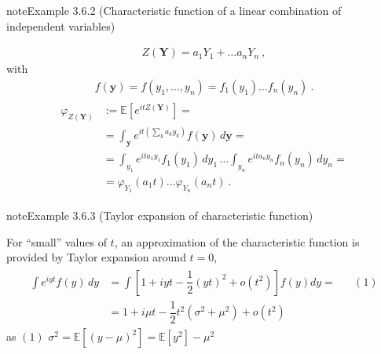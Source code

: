\documentclass[letterpaper,10pt,english]{jupyterBook}
\begin{document}
\begin{sphinxadmonition}{note}{Example 3.6.2 (Characteristic function of a linear combination of independent variables)}


\begin{equation*}
\begin{split}Z(\mathbf{Y}) = a_1 Y_1 + \dots a_n Y_n \ ,\end{split}
\end{equation*}
\sphinxAtStartPar
with
\begin{equation*}
\begin{split}f(\mathbf{y}) = f(y_1, \dots, y_n) =  f_1(y_1) \dots f_n(y_n) \ .\end{split}
\end{equation*}\begin{equation*}
\begin{split}\begin{aligned}
  \varphi_{Z(\mathbf{Y})} 
  & := \mathbb{E}\left[ e^{i t Z(\mathbf{Y})} \right] = \\
  & = \int_{\mathbf{y}} e^{i t \left( \sum_k a_k y_k \right)} f(\mathbf{y}) \, d \mathbf{y} = \\
  & = \int_{y_1} e^{i t a_1 y_1} f_1(y_1) \, d y_1 \, \dots \int_{y_n} e^{i t a_n y_n} f_n(y_n) \, d y_n = \\
  & = \varphi_{Y_1}(a_1 t) \dots \varphi_{Y_n}(a_n t) \ . 
\end{aligned}\end{split}
\end{equation*}\end{sphinxadmonition}
\label{ch/prob/characteristic-fun:ex:char-fun:taylor}
\begin{sphinxadmonition}{note}{Example 3.6.3 (Taylor expansion of characteristic function)}



\sphinxAtStartPar
For “small” values of \(t\), an approximation of the characteristic function is provided by Taylor expansion around \(t=0\),
\begin{equation*}
\begin{split}\begin{aligned}
\int e^{ i y t } f(y) \, dy 
& = \int \left[ 1 + i y t - \dfrac{1}{2} (yt)^2 + o(t^2) \right] f(y) dy = && (1) \\
& = 1 + i \mu t - \dfrac{1}{2} t^2 \left( \sigma^2 + \mu^2 \right) + o(t^2)
\end{aligned}\end{split}
\end{equation*}
\sphinxAtStartPar
as \((1)\) \(\sigma^2 = \mathbb{E}[(y - \mu)^2] = \mathbb{E}[y^2] - \mu^2\)
\end{sphinxadmonition}
\end{document}

